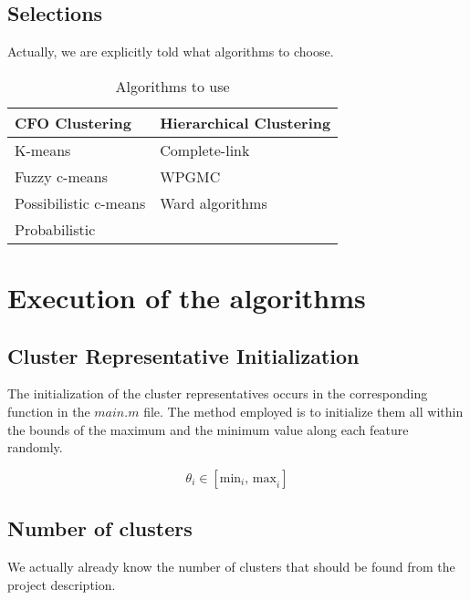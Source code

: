 \documentclass[12pt, a4paper]{article}
\begin{document}
\subsection{Selections}

Actually, we are explicitly told what algorithms to choose.

\begin{table}[H]
    \caption{Algorithms to use}\label{tab:choices}
    \begin{center}
        \begin{tabular}{l|l}
            \hline
            \textbf{CFO Clustering} & \textbf{Hierarchical Clustering} \\
            \hline
            K-means & Complete-link \\
            Fuzzy c-means & WPGMC \\
            Possibilistic c-means & Ward algorithms \\
            Probabilistic \\
            \hline
        \end{tabular}
    \end{center}
\end{table}


\section{Execution of the algorithms}

\subsection{Cluster Representative Initialization}

The initialization of the cluster representatives occurs in the corresponding function in the $main.m$ file. The method employed is to initialize them all within the bounds of the maximum and the minimum value along each feature randomly.

\[\theta_i \in \left[\text{min}_i \text{, max}_i\right]\]

\subsection{Number of clusters}

We actually already know the number of clusters that should be found from the project description.%
\end{document}
